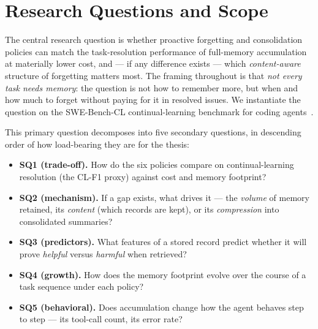 

\section{Research Questions and Scope}

The central research question is whether proactive forgetting and consolidation policies
can match the task-resolution performance of full-memory accumulation at materially lower
cost, and --- if any difference exists --- which \emph{content-aware} structure of
forgetting matters most. The framing throughout is that \emph{not every task needs
memory}: the question is not how to remember more, but when and how much to forget without
paying for it in resolved issues. We instantiate the question on the SWE-Bench-CL
continual-learning benchmark for coding agents~\cite{joshi2025}.

This primary question decomposes into five secondary questions, in descending order of
how load-bearing they are for the thesis:

\begin{itemize}
  \item \textbf{SQ1 (trade-off).} How do the six policies compare on continual-learning
        resolution (the CL-F1 proxy) against cost and memory footprint?
  \item \textbf{SQ2 (mechanism).} If a gap exists, what drives it --- the \emph{volume} of
        memory retained, its \emph{content} (which records are kept), or its
        \emph{compression} into consolidated summaries?
  \item \textbf{SQ3 (predictors).} What features of a stored record predict whether it
        will prove \emph{helpful} versus \emph{harmful} when retrieved?
  \item \textbf{SQ4 (growth).} How does the memory footprint evolve over the course of a
        task sequence under each policy?
  \item \textbf{SQ5 (behavioral).} Does accumulation change how the agent behaves
        step to step --- its tool-call count, its error rate?
\end{itemize}

